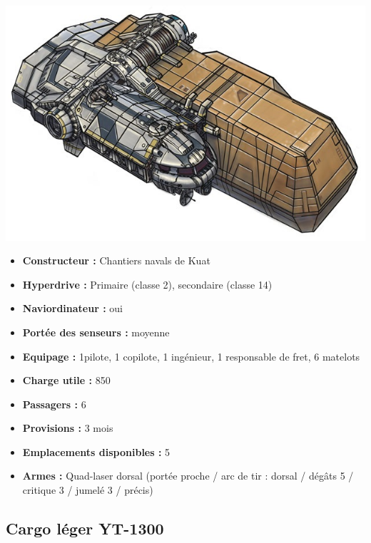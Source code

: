 \documentclass[twoside]{article}
\begin{document}
\noindent\begin{minipage}{0.3\textwidth}
	\includegraphics[width=1\linewidth]{../_img/species/wayfarer}
\end{minipage}%
\hfill%
\begin{minipage}{0.7\textwidth}\raggedleft
	\begin{itemize}
		\item \textbf{Constructeur :} Chantiers navals de Kuat
		\item \textbf{Hyperdrive :} Primaire (classe 2), secondaire (classe 14)
		\item \textbf{Naviordinateur :} oui
		\item \textbf{Portée des senseurs :} moyenne
		\item \textbf{Equipage :} 1pilote, 1 copilote, 1 ingénieur, 1 responsable de fret, 6 matelots
		\item \textbf{Charge utile :} 850
		\item \textbf{Passagers :} 6
		\item \textbf{Provisions :} 3 mois
		\item \textbf{Emplacements disponibles :} 5
		\item \textbf{Armes :} Quad-laser dorsal (portée proche / arc de tir : dorsal / dégâts 5 / critique 3 / jumelé 3 / précis)
	\end{itemize}
\end{minipage}

\subsection*{Cargo léger YT-1300}
\end{document}
